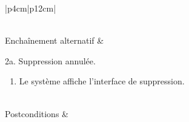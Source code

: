 \begin{longtable}{|p{4cm}|p{12cm}|}
\begin{minipage}[t]{\linewidth}
\begin{enumerate}[itemindent=0pt, leftmargin=*, nosep,after=\vspace{-\baselineskip},before=\vspace{-0.5\baselineskip}]
                    \end{enumerate}
                    \end{minipage}
                     \\
                    \hline
                    Enchaînement alternatif &  
                    \begin{minipage}[t]{\linewidth}
                        2a. Suppression annulée. \begin{enumerate}[nosep,after=\strut]
                              \item Le système affiche l'interface de suppression.
                        \end{enumerate}
                    \end{minipage}
                    \\
                    
                    \hline
                    Postconditions &   \\
                    \hline
                    \caption{Description du cas d'utilisation « Supprimer membre »}\\
            \end{longtable}            
            
